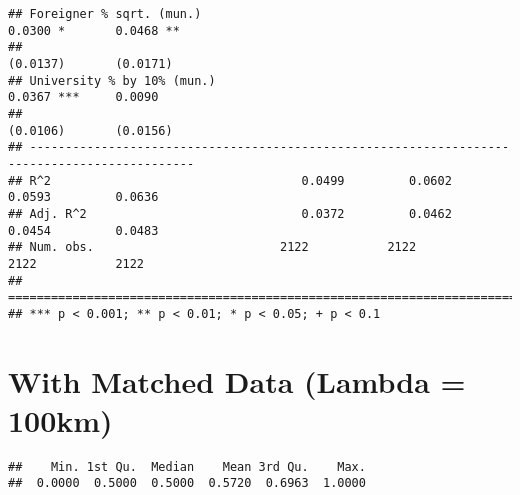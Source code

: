 \documentclass[
]{article}
\newenvironment{Shaded}{\begin{snugshade}}{\end{snugshade}}
\newcommand{\DecValTok}[1]{\textcolor[rgb]{0.00,0.00,0.81}{#1}}
\newcommand{\FloatTok}[1]{\textcolor[rgb]{0.00,0.00,0.81}{#1}}
\newcommand{\KeywordTok}[1]{\textcolor[rgb]{0.13,0.29,0.53}{\textbf{#1}}}
\newcommand{\NormalTok}[1]{#1}
\newcommand{\OperatorTok}[1]{\textcolor[rgb]{0.81,0.36,0.00}{\textbf{#1}}}
\newcommand{\StringTok}[1]{\textcolor[rgb]{0.31,0.60,0.02}{#1}}
\begin{document}
\begin{verbatim}
## Foreigner % sqrt. (mun.)                                            0.0300 *       0.0468 ** 
##                                                                    (0.0137)       (0.0171)   
## University % by 10% (mun.)                                          0.0367 ***     0.0090    
##                                                                    (0.0106)       (0.0156)   
## ---------------------------------------------------------------------------------------------
## R^2                                   0.0499         0.0602         0.0593         0.0636    
## Adj. R^2                              0.0372         0.0462         0.0454         0.0483    
## Num. obs.                          2122           2122           2122           2122         
## =============================================================================================
## *** p < 0.001; ** p < 0.01; * p < 0.05; + p < 0.1
\end{verbatim}

\hypertarget{with-matched-data-lambda-100km}{%
\section{With Matched Data (Lambda =
100km)}\label{with-matched-data-lambda-100km}}

\begin{Shaded}
\end{Shaded}

\begin{verbatim}
##    Min. 1st Qu.  Median    Mean 3rd Qu.    Max. 
##  0.0000  0.5000  0.5000  0.5720  0.6963  1.0000
\end{verbatim}

\begin{Shaded}
\end{Shaded}
\end{document}
